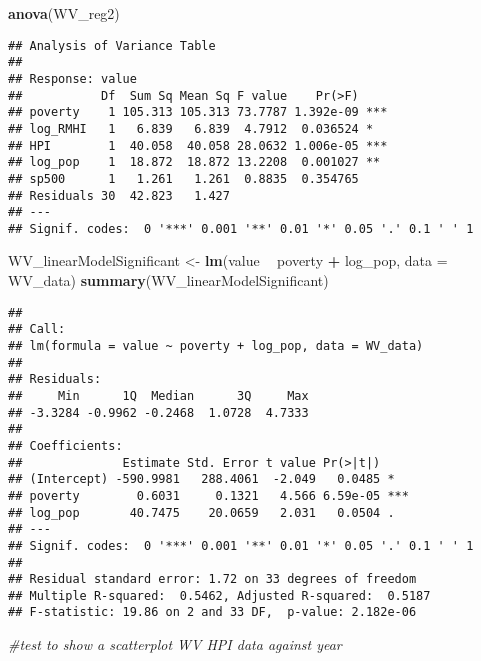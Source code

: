 \documentclass[
]{article}
\newenvironment{Shaded}{\begin{snugshade}}{\end{snugshade}}
\newcommand{\CommentTok}[1]{\textcolor[rgb]{0.56,0.35,0.01}{\textit{#1}}}
\newcommand{\DataTypeTok}[1]{\textcolor[rgb]{0.13,0.29,0.53}{#1}}
\newcommand{\KeywordTok}[1]{\textcolor[rgb]{0.13,0.29,0.53}{\textbf{#1}}}
\newcommand{\NormalTok}[1]{#1}
\newcommand{\OperatorTok}[1]{\textcolor[rgb]{0.81,0.36,0.00}{\textbf{#1}}}
\newcommand{\StringTok}[1]{\textcolor[rgb]{0.31,0.60,0.02}{#1}}
\begin{document}
\begin{Shaded}
\begin{Highlighting}[]
\KeywordTok{anova}\NormalTok{(WV_reg2)}
\end{Highlighting}
\end{Shaded}

\begin{verbatim}
## Analysis of Variance Table
## 
## Response: value
##           Df  Sum Sq Mean Sq F value    Pr(>F)    
## poverty    1 105.313 105.313 73.7787 1.392e-09 ***
## log_RMHI   1   6.839   6.839  4.7912  0.036524 *  
## HPI        1  40.058  40.058 28.0632 1.006e-05 ***
## log_pop    1  18.872  18.872 13.2208  0.001027 ** 
## sp500      1   1.261   1.261  0.8835  0.354765    
## Residuals 30  42.823   1.427                      
## ---
## Signif. codes:  0 '***' 0.001 '**' 0.01 '*' 0.05 '.' 0.1 ' ' 1
\end{verbatim}

\begin{Shaded}
\begin{Highlighting}[]
\NormalTok{WV_linearModelSignificant <-}\StringTok{ }\KeywordTok{lm}\NormalTok{(value }\OperatorTok{~}\StringTok{ }\NormalTok{poverty }\OperatorTok{+}\StringTok{ }\NormalTok{log_pop, }\DataTypeTok{data =}\NormalTok{ WV_data)}
\KeywordTok{summary}\NormalTok{(WV_linearModelSignificant)}
\end{Highlighting}
\end{Shaded}

\begin{verbatim}
## 
## Call:
## lm(formula = value ~ poverty + log_pop, data = WV_data)
## 
## Residuals:
##     Min      1Q  Median      3Q     Max 
## -3.3284 -0.9962 -0.2468  1.0728  4.7333 
## 
## Coefficients:
##              Estimate Std. Error t value Pr(>|t|)    
## (Intercept) -590.9981   288.4061  -2.049   0.0485 *  
## poverty        0.6031     0.1321   4.566 6.59e-05 ***
## log_pop       40.7475    20.0659   2.031   0.0504 .  
## ---
## Signif. codes:  0 '***' 0.001 '**' 0.01 '*' 0.05 '.' 0.1 ' ' 1
## 
## Residual standard error: 1.72 on 33 degrees of freedom
## Multiple R-squared:  0.5462, Adjusted R-squared:  0.5187 
## F-statistic: 19.86 on 2 and 33 DF,  p-value: 2.182e-06
\end{verbatim}

\begin{Shaded}
\begin{Highlighting}[]
\CommentTok{#test to show a scatterplot WV HPI data against year}
\end{Highlighting}
\end{Shaded}
\end{document}
